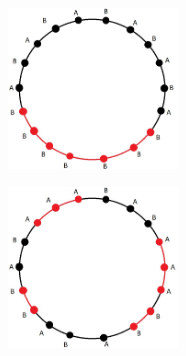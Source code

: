 \documentclass[]{book}
\theoremstyle{definition}
\begin{document}
\begin{figure}[H]
    \centering\includegraphics[width=0.4\textwidth]{figures/lemma.a.jpg}
    \caption{}
\end{figure}
\begin{figure}[H]
    \centering\includegraphics[width=0.4\textwidth]{figures/lemma.b.jpg}
    \caption{}
\end{figure}
\end{document}
